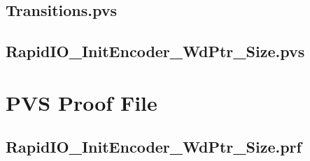 \subsection{Transitions.pvs} \label{app:encode:pvsgen:trans}


\subsection{RapidIO\_InitEncoder\_WdPtr\_Size.pvs} \label{app:encode:pvsgen:top}


\section{PVS Proof File} \label{app:encode:pvsprf}
\subsection{RapidIO\_InitEncoder\_WdPtr\_Size.prf} \label{app:encode:pvsgen:prf:prf}
